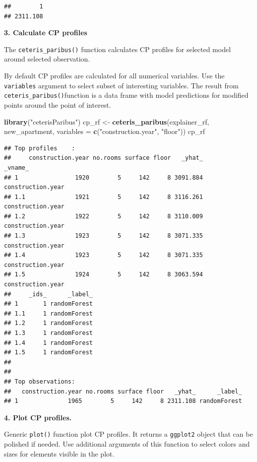 \documentclass[]{book}
\newenvironment{Shaded}{\begin{snugshade}}{\end{snugshade}}
\newcommand{\DataTypeTok}[1]{\textcolor[rgb]{0.13,0.29,0.53}{#1}}
\newcommand{\KeywordTok}[1]{\textcolor[rgb]{0.13,0.29,0.53}{\textbf{#1}}}
\newcommand{\NormalTok}[1]{#1}
\newcommand{\StringTok}[1]{\textcolor[rgb]{0.31,0.60,0.02}{#1}}
\theoremstyle{definition}
\theoremstyle{definition}
\theoremstyle{definition}
\theoremstyle{remark}
\begin{document}
\begin{verbatim}
##        1 
## 2311.108
\end{verbatim}

\textbf{3. Calculate CP profiles}

The \texttt{ceteris\_paribus()} function calculates CP profiles for
selected model around selected observation.

By default CP profiles are calculated for all numerical variables. Use
the \texttt{variables} argument to select subset of interesting
variables. The result from \texttt{ceteris\_paribus()}function is a data
frame with model predictions for modified points around the point of
interest.

\begin{Shaded}
\begin{Highlighting}[]
\KeywordTok{library}\NormalTok{(}\StringTok{"ceterisParibus"}\NormalTok{)}
\NormalTok{cp_rf <-}\StringTok{ }\KeywordTok{ceteris_paribus}\NormalTok{(explainer_rf, new_apartment, }
                            \DataTypeTok{variables =} \KeywordTok{c}\NormalTok{(}\StringTok{"construction.year"}\NormalTok{, }\StringTok{"floor"}\NormalTok{))}
\NormalTok{cp_rf}
\end{Highlighting}
\end{Shaded}

\begin{verbatim}
## Top profiles    : 
##     construction.year no.rooms surface floor   _yhat_           _vname_
## 1                1920        5     142     8 3091.884 construction.year
## 1.1              1921        5     142     8 3116.261 construction.year
## 1.2              1922        5     142     8 3110.009 construction.year
## 1.3              1923        5     142     8 3071.335 construction.year
## 1.4              1923        5     142     8 3071.335 construction.year
## 1.5              1924        5     142     8 3063.594 construction.year
##     _ids_      _label_
## 1       1 randomForest
## 1.1     1 randomForest
## 1.2     1 randomForest
## 1.3     1 randomForest
## 1.4     1 randomForest
## 1.5     1 randomForest
## 
## 
## Top observations:
##   construction.year no.rooms surface floor   _yhat_      _label_
## 1              1965        5     142     8 2311.108 randomForest
\end{verbatim}

\textbf{4. Plot CP profiles.}

Generic \texttt{plot()} function plot CP profiles. It returns a
\texttt{ggplot2} object that can be polished if needed. Use additional
arguments of this function to select colors and sizes for elements
visible in the plot.
\end{document}
